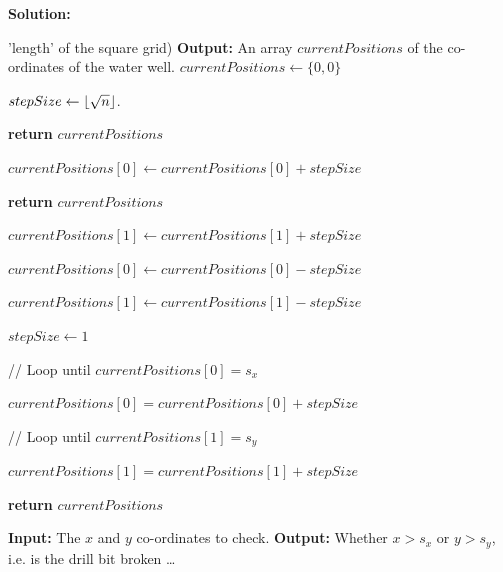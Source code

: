 \documentclass[a4,13pt]{extarticle}
\DeclarePairedDelimiter\floor{\lfloor}{\rfloor}
\newenvironment{Solution}{\color{blue}\textbf{Solution:}}{}
\begin{document}
\begin{enumerate}
\begin{enumerate}
\begin{Solution}
\begin{algorithm}[H]
\begin{algorithmic}[1]
\quad\quad\quad 'length' of the square grid)
			\State\textbf{Output: }An array $currentPositions$ of the co-ordinates of the water well.
\State $currentPositions\gets{\{0, 0\}}$

\State $stepSize\gets\floor{\sqrt{n}}$.



\State\textbf{return} $currentPositions$

\EndIf

\State $currentPositions[0] \gets currentPositions[0] + stepSize$

\EndWhile



\State\textbf{return} $currentPositions$

\EndIf

\State $currentPositions[1] \gets currentPositions[1] + stepSize$

\EndWhile

\State $currentPositions[0]\gets currentPositions[0] - stepSize$

\State $currentPositions[1]\gets currentPositions[1] - stepSize$

\State $stepSize\gets1$

\State // Loop until $currentPositions[0]=s_x$

\State $currentPositions[0] = currentPositions[0] + stepSize$

\EndWhile

\State // Loop until $currentPositions[1]=s_y$

\State $currentPositions[1] = currentPositions[1] + stepSize$

\EndWhile

\State\textbf{return} $currentPositions$

	      		\EndProcedure
	      	\end{algorithmic}
	      \end{algorithm}

\begin{algorithm}[H]
      	\begin{algorithmic}[1]
\State\textbf{Input: }The $x$ and $y$ co-ordinates to check.
			\State\textbf{Output: }Whether $x>s_x$ or $y>s_y$, i.e. is the drill bit broken
\State \dots
	      		\EndProcedure
	      	\end{algorithmic}
	      \end{algorithm}


\end{Solution}
\end{enumerate}
\end{enumerate}
\end{document}
